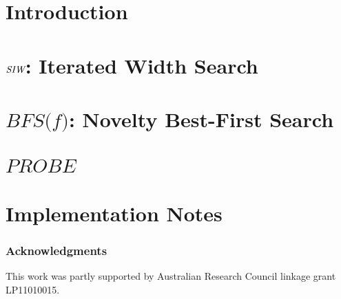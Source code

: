 \documentclass[letterpaper]{article}
\begin{document}
\section{Introduction}


\section{${\textit{SIW}}$: Iterated Width Search}


\section{$\textit{BFS(f)}$: Novelty Best-First Search}


\section{$\textit{PROBE}$}


\section{Implementation Notes}





\subsubsection{Acknowledgments}
This work was partly supported by  Australian Research Council linkage grant LP11010015. 




\end{document}
